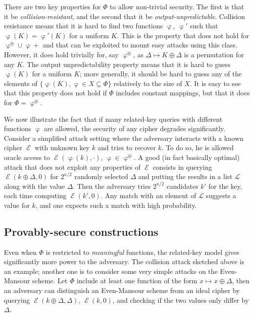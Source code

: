 \documentclass[11pt,a4paper]{article}
\theoremstyle{definition}
\DeclareMathOperator\E{\mathcal{E}}
\DeclareMathOperator\rkf{\varphi}
\begin{document}
There are two key properties for $\Phi$ to allow non-trivial security. The first is that it be \emph{collision-resistant}, and the second that it
be \emph{output-unpredictable}. Collision resistance means that it is hard to find two functions $\rkf$, $\rkf'$ such that $\rkf(K) = \rkf'(K)$
for a uniform $K$. This is
the property that does not hold for $\rkf^\oplus \cup \rkf+$ and that can be exploited to mount easy attacks using this class. However, it does
hold trivially for, say $\rkf^\oplus$, as $\Delta \mapsto K \oplus \Delta$ is a permutation for any $K$.
The output unpredictability property means that it is hard to guess $\rkf(K)$ for a uniform $K$; more generally, it should be hard
to guess any of the elements of $\{\rkf(K), \rkf \in X \subseteq \Phi\}$ relatively to the size of $X$. It is easy to see that this property does not hold if
$\Phi$ includes constant mappings, but that it does for $\Phi = \rkf^\oplus$.

We now illustrate the fact that if many related-key queries with different functions $\rkf$ are allowed, the security of any cipher
degrades significantly. Consider a simplified attack setting where the adversary interacts with a known cipher $\E$ with unknown key $k$ and
tries to recover $k$. To do so, he is allowed oracle access to $\E(\rkf(k),\cdot)$, $\rkf \in \rkf^\oplus$. A good (in fact basically optimal)
attack that does not exploit any properties of $\E$ consists in querying $\E(k \oplus \Delta,0)$ for $2^{\kappa/2}$ randomly selected
$\Delta$ and putting the results in a list $\mathcal{L}$ along with the value $\Delta$. Then the adversary tries $2^{\kappa/2}$ candidates $k'$ for the key,
each time computing $\E(k',0)$. Any match with an element of $\mathcal{L}$ suggests a value for $k$, and one expects such a match with high probability.

\subsection{Provably-secure constructions}

Even when $\Phi$ is restricted to \emph{meaningful} functions, the related-key model gives significantly more power to the adversary. The collision attack
sketched above is an example; another one is to consider some very simple attacks on the Even-Mansour scheme. Let $\Phi$ include at least one
function of the form $x \mapsto x \oplus \Delta$, then an adversary can distinguish an Even-Mansour scheme from an ideal cipher by querying
$\E(k \oplus \Delta, \Delta)$, $\E(k, 0)$, and checking if the two values only differ by $\Delta$.
\end{document}
